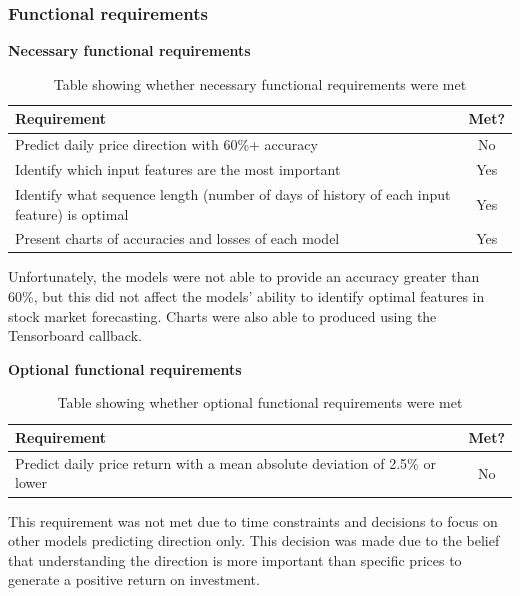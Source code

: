 \subsubsection{Functional requirements}
\textbf{Necessary functional requirements}
\begin{table}[ht]
    \centering
    \begin{tabular}{|p{100mm}|c|}
        \hline
        Requirement & Met? \\
        \hline\hline
        Predict daily price direction with 60\%+ accuracy & No \\
        Identify which input features are the most important & Yes \\
        Identify what sequence length (number of days of history of each input feature) is optimal & Yes \\
        Present charts of accuracies and losses of each model & Yes \\
        \hline
    \end{tabular}
    \caption{Table showing whether necessary functional requirements were met}
    \label{tab:necessary_functional_requirements}
\end{table}
\FloatBarrier

Unfortunately, the models were not able to provide an accuracy greater than 60\%, but this did not
affect the models' ability to identify optimal features in stock market forecasting. Charts were
also able to produced using the Tensorboard callback.

\textbf{Optional functional requirements}
\begin{table}[ht]
    \centering
    \begin{tabular}{|p{100mm}|c|}
        \hline
        Requirement & Met? \\
        \hline\hline
        Predict daily price return with a mean absolute deviation of 2.5\% or lower & No \\
        \hline
    \end{tabular}
    \caption{Table showing whether optional functional requirements were met}
    \label{tab:optional_functional_requirements}
\end{table}
\FloatBarrier

This requirement was not met due to time constraints and decisions to focus on other models
predicting direction only. This decision was made due to the belief that understanding
the direction is more important than specific prices to generate a positive return on investment.

